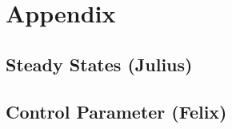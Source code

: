 \chapter{Appendix}
\section{Steady States (Julius)}

\newpage
\section{Control Parameter (Felix)}


